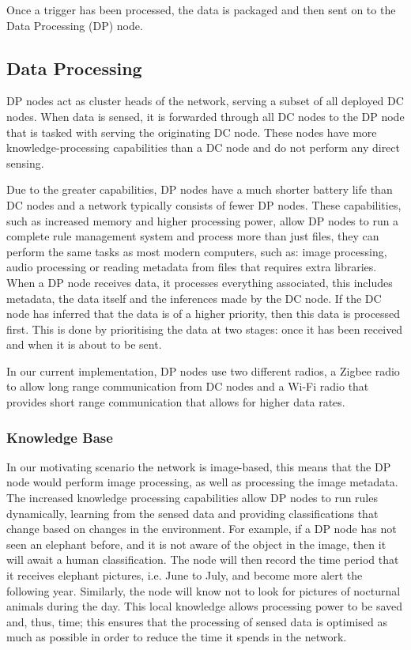 Once a trigger has been processed, the data is packaged and then sent on to the Data Processing (DP) node.

	\subsection{Data Processing}
	DP nodes act as cluster heads of the network, serving a subset of all deployed DC nodes. When data is sensed, it is forwarded through all DC nodes to the DP node that is tasked with serving the originating DC node. These nodes have more knowledge-processing capabilities than a DC node and do not perform any direct sensing. 

	Due to the greater capabilities, DP nodes have a much shorter battery life than DC nodes and a network typically consists of fewer DP nodes. These capabilities, such as increased memory and higher processing power, allow DP nodes to run a complete rule management system and process more than just files, they can perform the same tasks as most modern computers, such as: image processing, audio processing or reading metadata from files that requires extra libraries. When a DP node receives data, it processes everything associated, this includes metadata, the data itself and the inferences made by the DC node. If the DC node has inferred that the data is of a higher priority, then this data is processed first. This is done by prioritising the data at two stages: once it has been received and when it is about to be sent.

	In our current implementation, DP nodes use two different radios, a Zigbee radio to allow long range communication from DC nodes and a Wi-Fi radio that provides short range communication that allows for higher data rates.

	\subsubsection{Knowledge Base}
	In our motivating scenario the network is image-based, this means that the DP node would perform image processing, as well as processing the image metadata. The increased knowledge processing capabilities allow DP nodes to run rules dynamically, learning from the sensed data and providing classifications that change based on changes in the environment. For example, if a DP node has not seen an elephant before, and it is not aware of the object in the image, then it will await a human classification. The node will then record the time period that it receives elephant pictures, i.e. June to July, and become more alert the following year. Similarly, the node will know not to look for pictures of nocturnal animals during the day. This local knowledge allows processing power to be saved and, thus, time; this ensures that the processing of sensed data is optimised as much as possible in order to reduce the time it spends in the network.
	
